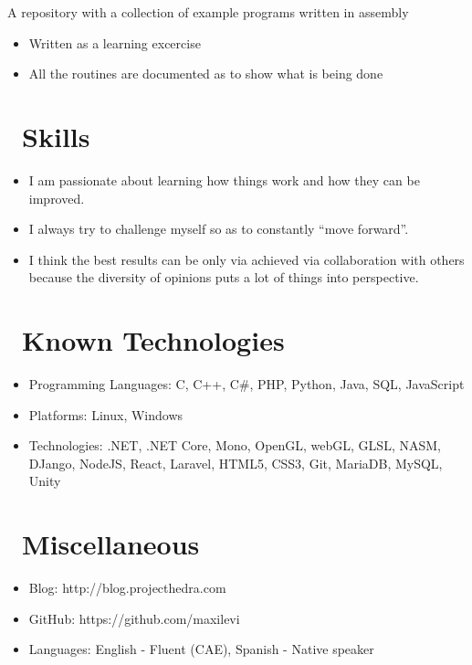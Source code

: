 \documentclass{resume}
\begin{document}
A repository with a collection of example programs written in assembly
\begin{itemize}
  \item Written as a learning excercise
  \item All the routines are documented as to show what is being done
\end{itemize}

\section{\faCogs\ Skills}
\begin{itemize}[parsep=0.5ex]
  \item I am passionate about learning how things work and how they can be improved.
  \item I always try to challenge myself so as to constantly “move forward”.
  \item I think the best results can be only via achieved via collaboration with others because the diversity of opinions puts a lot of things into perspective.
\end{itemize}

\section{\faCogs\ Known Technologies}
\begin{itemize}[parsep=0.5ex]
  \item Programming Languages: C, C++, C\#, PHP, Python, Java, SQL, JavaScript
  \item Platforms: Linux, Windows
  \item Technologies: .NET, .NET Core, Mono, OpenGL, webGL, GLSL, NASM, DJango, NodeJS, React, Laravel, HTML5, CSS3, Git, MariaDB, MySQL, Unity
\end{itemize}

\section{\faInfo\ Miscellaneous}
\begin{itemize}[parsep=0.5ex]
  \item Blog: http://blog.projecthedra.com
  \item GitHub: https://github.com/maxilevi
  \item Languages: English - Fluent (CAE), Spanish - Native speaker
\end{itemize}
\end{document}
